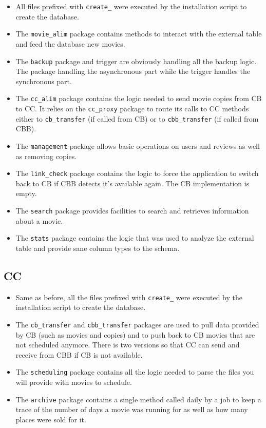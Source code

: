 \documentclass[a4paper]{article}
\begin{document}
\begin{itemize}
	\item All files prefixed with \texttt{create\_} were executed by the installation script to create the database.
	\item The \texttt{movie\_alim} package contains methods to interact with the external table and feed the database new movies.
	\item The \texttt{backup} package and trigger are obviously handling all the backup logic. The package handling the asynchronous part while the trigger handles the synchronous part.
	\item The \texttt{cc\_alim} package contains the logic needed to send movie copies from CB to CC. It relies on the \texttt{cc\_proxy} package to route its calls to CC methods either to \texttt{cb\_transfer} (if called from CB) or to \texttt{cbb\_transfer} (if called from CBB).
	\item The \texttt{management} package allows basic operations on users and reviews as well as removing copies.
	\item The \texttt{link\_check} package contains the logic to force the application to switch back to CB if CBB detects it's available again. The CB implementation is empty.
	\item The \texttt{search} package provides facilities to search and retrieves information about a movie.
	\item The \texttt{stats} package contains the logic that was used to analyze the external table and provide sane column types to the schema.
\end{itemize}

\subsection{CC}

\begin{itemize}
	\item Same as before, all the files prefixed with \texttt{create\_} were executed by the installation script to create the database.
	\item The \texttt{cb\_transfer} and \texttt{cbb\_transfer} packages are used to pull data provided by CB (such as movies and copies) and to push back to CB movies that are not scheduled anymore. There is two versions so that CC can send and receive from CBB if CB is not available.
	\item The \texttt{scheduling} package contains all the logic needed to parse the files you will provide with movies to schedule.
	\item The \texttt{archive} package contains a single method called daily by a job to keep a trace of the number of days a movie was running for as well as how many places were sold for it.
\end{itemize}
\end{document}
